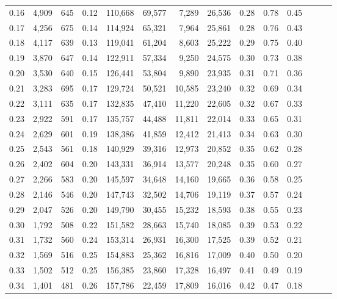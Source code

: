 \begin{tabular}{rrrrrrrrrrrrrr}
0.16 &   4,909 &  645 &  0.12 &  110,668 &   69,577 &   7,289 &  26,536 &  0.28 &  0.78 &      0.45 \\
0.17 &   4,256 &  675 &  0.14 &  114,924 &   65,321 &   7,964 &  25,861 &  0.28 &  0.76 &      0.43 \\
0.18 &   4,117 &  639 &  0.13 &  119,041 &   61,204 &   8,603 &  25,222 &  0.29 &  0.75 &      0.40 \\
0.19 &   3,870 &  647 &  0.14 &  122,911 &   57,334 &   9,250 &  24,575 &  0.30 &  0.73 &      0.38 \\
0.20 &   3,530 &  640 &  0.15 &  126,441 &   53,804 &   9,890 &  23,935 &  0.31 &  0.71 &      0.36 \\
0.21 &   3,283 &  695 &  0.17 &  129,724 &   50,521 &  10,585 &  23,240 &  0.32 &  0.69 &      0.34 \\
0.22 &   3,111 &  635 &  0.17 &  132,835 &   47,410 &  11,220 &  22,605 &  0.32 &  0.67 &      0.33 \\
0.23 &   2,922 &  591 &  0.17 &  135,757 &   44,488 &  11,811 &  22,014 &  0.33 &  0.65 &      0.31 \\
0.24 &   2,629 &  601 &  0.19 &  138,386 &   41,859 &  12,412 &  21,413 &  0.34 &  0.63 &      0.30 \\
0.25 &   2,543 &  561 &  0.18 &  140,929 &   39,316 &  12,973 &  20,852 &  0.35 &  0.62 &      0.28 \\
0.26 &   2,402 &  604 &  0.20 &  143,331 &   36,914 &  13,577 &  20,248 &  0.35 &  0.60 &      0.27 \\
0.27 &   2,266 &  583 &  0.20 &  145,597 &   34,648 &  14,160 &  19,665 &  0.36 &  0.58 &      0.25 \\
0.28 &   2,146 &  546 &  0.20 &  147,743 &   32,502 &  14,706 &  19,119 &  0.37 &  0.57 &      0.24 \\
0.29 &   2,047 &  526 &  0.20 &  149,790 &   30,455 &  15,232 &  18,593 &  0.38 &  0.55 &      0.23 \\
0.30 &   1,792 &  508 &  0.22 &  151,582 &   28,663 &  15,740 &  18,085 &  0.39 &  0.53 &      0.22 \\
0.31 &   1,732 &  560 &  0.24 &  153,314 &   26,931 &  16,300 &  17,525 &  0.39 &  0.52 &      0.21 \\
0.32 &   1,569 &  516 &  0.25 &  154,883 &   25,362 &  16,816 &  17,009 &  0.40 &  0.50 &      0.20 \\
0.33 &   1,502 &  512 &  0.25 &  156,385 &   23,860 &  17,328 &  16,497 &  0.41 &  0.49 &      0.19 \\
0.34 &   1,401 &  481 &  0.26 &  157,786 &   22,459 &  17,809 &  16,016 &  0.42 &  0.47 &      0.18 \\

\end{tabular}
